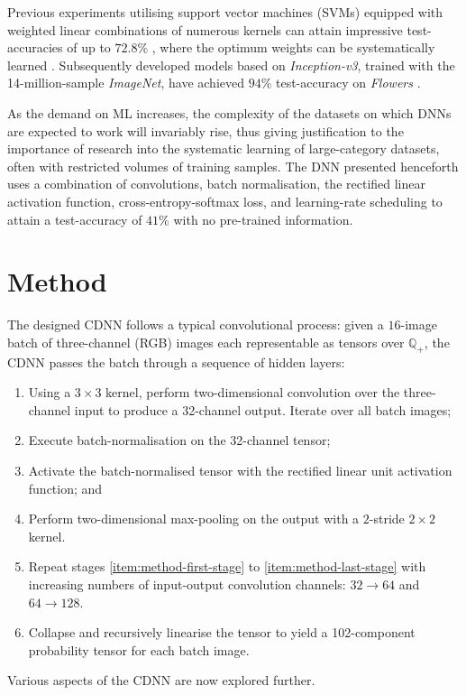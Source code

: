 \documentclass[journal]{IEEEtran}
\newcommand\networkperformance{41}
\begin{document}
Previous experiments utilising support vector machines (SVMs) equipped with
weighted linear combinations of numerous kernels can attain impressive
test-accuracies of up to $72.8$\% \cite{Nilsback:2008}, where the optimum
weights can be systematically learned \cite{Varma:2007}. Subsequently developed
models based on \emph{Inception-v3}, trained with the 14-million-sample
\emph{ImageNet}, have achieved $94$\% test-accuracy on \emph{Flowers}
\cite{Xia:2017}.

As the demand on ML increases, the complexity of the datasets on which DNNs are
expected to work will invariably rise, thus giving justification to the
importance of research into the systematic learning of large-category datasets,
often with restricted volumes of training samples.  The DNN presented henceforth
uses a combination of convolutions, batch normalisation, the rectified linear
activation function, cross-entropy-softmax loss, and learning-rate scheduling to
attain a test-accuracy of $\networkperformance$\% with no pre-trained
information.

\section{Method}
The designed CDNN follows a typical convolutional process: given a $16$-image
batch of three-channel (RGB) images each representable as tensors over
$\mathbb{Q}_+$, the CDNN passes the batch through a sequence of hidden layers:
\begin{enumerate}
    \item Using a $3 \times 3$ kernel, perform two-dimensional convolution over
        the three-channel input to produce a 32-channel output. Iterate
        over all batch images; \label{item:method-first-stage}
    \item Execute batch-normalisation on the 32-channel tensor;
    \item Activate the batch-normalised tensor with the rectified linear unit
        activation function; and
    \item Perform two-dimensional max-pooling on the output with a $2$-stride $2
        \times 2$ kernel. \label{item:method-last-stage}
    \item Repeat stages \ref{item:method-first-stage} to
        \ref{item:method-last-stage} with increasing numbers of input-output
        convolution channels: $32 \to 64$ and $64 \to 128$.
    \item Collapse and recursively linearise the tensor to yield a
        102-component probability tensor for each batch image.
\end{enumerate}
Various aspects of the CDNN are now explored further.
\end{document}
